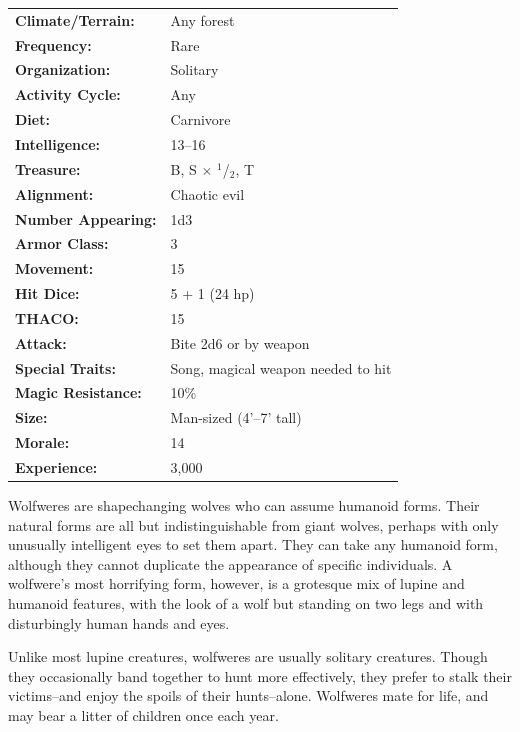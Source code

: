 \begin{multicols}{2}
\begin{minipage}{\columnwidth}
\noindent \begin{tabular}{p{}p{}}
\textbf{Climate/Terrain:}	& Any forest	\\
\textbf{Frequency:} 		& Rare	\\
\textbf{Organization:} 		& Solitary	\\
\textbf{Activity Cycle:} 	& Any	\\
\textbf{Diet:} 				& Carnivore	\\
\textbf{Intelligence:} 		& 13--16	\\
\textbf{Treasure:} 			& B, S $\times$ $^1$/$_2$, T	\\
\textbf{Alignment:} 		& Chaotic evil	\\
\hline
\textbf{Number Appearing:} 	& 1d3	\\
\textbf{Armor Class:} 		& 3	\\
\textbf{Movement:} 			& 15	\\
\textbf{Hit Dice:} 			& 5 + 1 (24 hp)	\\
\textbf{THACO:} 			& 15	\\
\textbf{Attack:} 			& Bite 2d6 or by weapon	\\
\textbf{Special Traits:} & Song, magical weapon needed to hit	\\
\textbf{Magic Resistance:} 	& 10\%	\\
\textbf{Size:} 				& Man-sized (4'--7' tall)	\\
\textbf{Morale:} 			& 14	\\
\textbf{Experience:} 		& 3,000	\\ %
\end{tabular}

\end{minipage}

Wolfweres are shapechanging wolves who can assume humanoid forms. Their natural forms are all but indistinguishable from giant wolves, perhaps with only unusually intelligent eyes to set them apart. They can take any humanoid form, although they cannot duplicate the appearance of specific individuals. A wolfwere's most horrifying form, however, is a grotesque mix of lupine and humanoid features, with the look of a wolf but standing on two legs and with disturbingly human hands and eyes.

Unlike most lupine creatures, wolfweres are usually solitary creatures. Though they occasionally band together to hunt more effectively, they prefer to stalk their victims--and enjoy the spoils of their hunts--alone. Wolfweres mate for life, and may bear a litter of children once each year.


\end{multicols}
